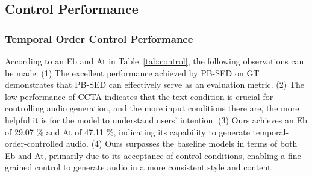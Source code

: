 \documentclass[letterpaper]{article} %
\begin{document}
\subsection{Control Performance}

\begin{table}[!h]\footnotesize
    \centering
    \caption{The control performance between Ours and baseline models. ``GT'' stands for the ground-truth recordings.}
    \label{tab:control}
\end{table}

\subsubsection{Temporal Order Control Performance} According to an Eb and At in Table~\ref{tab:control}, the following observations can be made: (1) The excellent performance achieved by PB-SED on GT demonstrates that PB-SED can effectively serve as an evaluation metric. (2) The low performance of CCTA indicates that the text condition is crucial for controlling audio generation, and the more input conditions there are, the more helpful it is for the model to understand users' intention. (3) Ours achieves an Eb of 29.07 \% and At of 47.11 \%, indicating its capability to generate temporal-order-controlled audio. (4) Ours surpasses the baseline models in terms of both Eb and At, primarily due to its acceptance of control conditions, enabling a fine-grained control to generate audio in a more consistent style and content.
\end{document}
